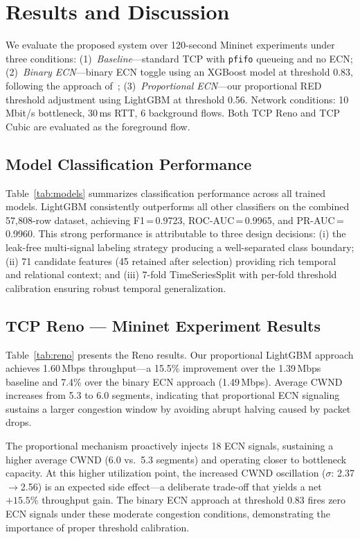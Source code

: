 \section{Results and Discussion}
\label{sec:results}

We evaluate the proposed system over 120-second Mininet experiments under three conditions: (1)~\emph{Baseline}---standard TCP with \texttt{pfifo} queueing and no ECN; (2)~\emph{Binary ECN}---binary ECN toggle using an XGBoost model at threshold 0.83, following the approach of~\cite{welzl2024}; (3)~\emph{Proportional ECN}---our proportional RED threshold adjustment using LightGBM at threshold 0.56. Network conditions: 10\,Mbit/s bottleneck, 30\,ms RTT, 6 background flows. Both TCP Reno and TCP Cubic are evaluated as the foreground flow.

\subsection{Model Classification Performance}

Table~\ref{tab:models} summarizes classification performance across all trained models. LightGBM consistently outperforms all other classifiers on the combined 57,808-row dataset, achieving F1\,=\,0.9723, ROC-AUC\,=\,0.9965, and PR-AUC\,=\,0.9960. This strong performance is attributable to three design decisions: (i) the leak-free multi-signal labeling strategy producing a well-separated class boundary; (ii) 71 candidate features (45 retained after selection) providing rich temporal and relational context; and (iii) 7-fold TimeSeriesSplit with per-fold threshold calibration ensuring robust temporal generalization.

\subsection{TCP Reno --- Mininet Experiment Results}

Table~\ref{tab:reno} presents the Reno results. Our proportional LightGBM approach achieves 1.60\,Mbps throughput---a 15.5\% improvement over the 1.39\,Mbps baseline and 7.4\% over the binary ECN approach (1.49\,Mbps). Average CWND increases from 5.3 to 6.0 segments, indicating that proportional ECN signaling sustains a larger congestion window by avoiding abrupt halving caused by packet drops.

The proportional mechanism proactively injects 18 ECN signals, sustaining a higher average CWND (6.0 vs.\ 5.3 segments) and operating closer to bottleneck capacity. At this higher utilization point, the increased CWND oscillation ($\sigma$: 2.37$\rightarrow$2.56) is an expected side effect---a deliberate trade-off that yields a net $+15.5\%$ throughput gain. The binary ECN approach at threshold 0.83 fires zero ECN signals under these moderate congestion conditions, demonstrating the importance of proper threshold calibration.

